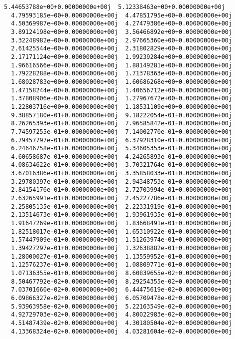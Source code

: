 \documentclass[11pt]{article}
\begin{document}
\begin{Verbatim}[commandchars=\\\{\}]
  5.44653788e+00+0.00000000e+00j  5.12338463e+00+0.00000000e+00j
  4.79593185e+00+0.00000000e+00j  4.47851795e+00+0.00000000e+00j
  4.50369987e+00+0.00000000e+00j  4.27479386e+00+0.00000000e+00j
  3.89124198e+00+0.00000000e+00j  3.56466892e+00+0.00000000e+00j
  3.32248982e+00+0.00000000e+00j  2.97665360e+00+0.00000000e+00j
  2.61425544e+00+0.00000000e+00j  2.31802829e+00+0.00000000e+00j
  2.17171124e+00+0.00000000e+00j  1.99239284e+00+0.00000000e+00j
  1.96616566e+00+0.00000000e+00j  1.88149281e+00+0.00000000e+00j
  1.79228288e+00+0.00000000e+00j  1.71378363e+00+0.00000000e+00j
  1.68028783e+00+0.00000000e+00j  1.60686268e+00+0.00000000e+00j
  1.47158244e+00+0.00000000e+00j  1.40656712e+00+0.00000000e+00j
  1.37808906e+00+0.00000000e+00j  1.27967672e+00+0.00000000e+00j
  1.22803716e+00+0.00000000e+00j  1.18531109e+00+0.00000000e+00j
  9.38857180e-01+0.00000000e+00j  9.18222054e-01+0.00000000e+00j
  8.26265393e-01+0.00000000e+00j  7.96585842e-01+0.00000000e+00j
  7.74597255e-01+0.00000000e+00j  7.14002770e-01+0.00000000e+00j
  6.79457797e-01+0.00000000e+00j  6.37928310e-01+0.00000000e+00j
  6.24646758e-01+0.00000000e+00j  5.34605353e-01+0.00000000e+00j
  4.60658687e-01+0.00000000e+00j  4.24265893e-01+0.00000000e+00j
  4.08634622e-01+0.00000000e+00j  3.70321764e-01+0.00000000e+00j
  3.67016386e-01+0.00000000e+00j  3.35858033e-01+0.00000000e+00j
  3.29780397e-01+0.00000000e+00j  2.94348753e-01+0.00000000e+00j
  2.84154176e-01+0.00000000e+00j  2.72703994e-01+0.00000000e+00j
  2.63265991e-01+0.00000000e+00j  2.45227786e-01+0.00000000e+00j
  2.25805135e-01+0.00000000e+00j  2.22331919e-01+0.00000000e+00j
  2.13514673e-01+0.00000000e+00j  1.93961935e-01+0.00000000e+00j
  1.91647269e-01+0.00000000e+00j  1.83668491e-01+0.00000000e+00j
  1.82518017e-01+0.00000000e+00j  1.65310922e-01+0.00000000e+00j
  1.57447909e-01+0.00000000e+00j  1.51263974e-01+0.00000000e+00j
  1.39427297e-01+0.00000000e+00j  1.32638882e-01+0.00000000e+00j
  1.28000027e-01+0.00000000e+00j  1.13559952e-01+0.00000000e+00j
  1.12576237e-01+0.00000000e+00j  1.08809771e-01+0.00000000e+00j
  1.07136355e-01+0.00000000e+00j  8.60839655e-02+0.00000000e+00j
  8.50467792e-02+0.00000000e+00j  8.29254355e-02+0.00000000e+00j
  7.03701660e-02+0.00000000e+00j  6.44475619e-02+0.00000000e+00j
  6.09866327e-02+0.00000000e+00j  6.05709478e-02+0.00000000e+00j
  5.93963958e-02+0.00000000e+00j  5.22163549e-02+0.00000000e+00j
  4.92729703e-02+0.00000000e+00j  4.80022983e-02+0.00000000e+00j
  4.51487439e-02+0.00000000e+00j  4.30180504e-02+0.00000000e+00j
  4.13368324e-02+0.00000000e+00j  4.03281604e-02+0.00000000e+00j

\end{Verbatim}
\end{document}
